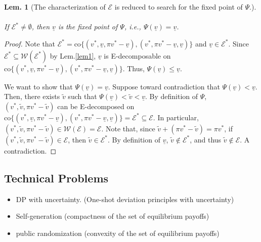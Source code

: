 \documentclass[11pt,a4paper,dvipdfmx]{article}
\newtheorem{lem}{Lem.}
\newcommand{\mE}{\mathcal{E}}
\newcommand{\mW}{\mathcal{W}}
\renewcommand{\tilde}{\widetilde}
\newcommand{\1}{\mathbbm{1}}
\begin{document}
\begin{lem}[The characterization of $\mE$ is reduced to search for the fixed point of $\Psi$.] \ \\
\indent
	If $\mE^* \neq \emptyset$, then $\underline{v}$ is the fixed point of $\Psi$, i.e., $\Psi(\underline{v}) = \underline{v}$.
\end{lem}
\begin{proof}
	Note that $\mE^* = \text{co}\{(v^*, \underline{v}, \pi v^* - \underline{v}), (v^*, \pi v^* - \underline{v}, \underline{v}) \}$ and $\underline{v} \in \mE^*$. Since $\mE^* \subseteq \mW(\mE^*)$ by Lem.\ref{lem1}, $\underline{v}$ is E-decomposable on $\text{co}\{(v^*, \underline{v}, \pi v^* - \underline{v}), (v^*, \pi v^* - \underline{v}, \underline{v}) \}$. Thus, $\Psi(\underline{v}) \leq \underline{v}$. 
	
	We want to show that $\Psi(\underline{v}) = \underline{v}$. Suppose toward contradiction that $\Psi(\underline{v}) < \underline{v}$.
	Then, there exists $\tilde{v}$ such that $\Psi(\underline{v}) < \tilde{v} < \underline{v}$.
	By definition of $\Psi$, $(v^*, \tilde{v}, \pi v^* - \tilde{v})$ can be E-decomposed on $\text{co} \{(v^*, \underline{v}, \pi v^* - \underline{v}), (v^*, \pi v^* - \underline{v}, \underline{v}) \} = \mE^* \subseteq \mE$.
	In particular, $(v^*, \tilde{v}, \pi v^* - \tilde{v}) \in \mW(\mE) = \mE$. Note that, since $\tilde{v} + (\pi v^* - \tilde{v}) = \pi v^*$, if $(v^*, \tilde{v}, \pi v^* - \tilde{v}) \in \mE$, then $\tilde{v} \in \mE^*$. By definition of $\underline{v}$, $\tilde{v} \notin \mE^*$, and thus $\tilde{v} \notin \mE$. A contradiction.	
\end{proof}


\subsection*{Technical Problems}
\begin{itemize}
	\item DP with uncertainty. (One-shot deviation principles with uncertainty)
	\item Self-generation (compactness of the set of equilibrium payoffs)
	\item public randomization (convexity of the set of equilibrium payoffs)
\end{itemize}
\end{document}
